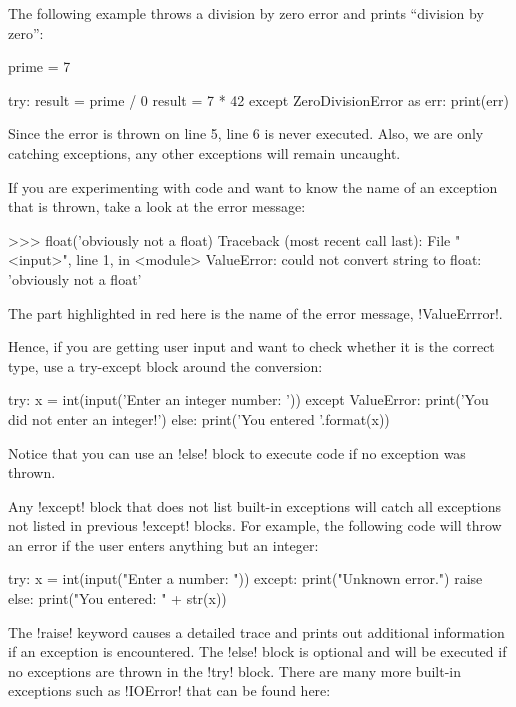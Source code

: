 \documentclass[11pt]{cselabheader}
\begin{document}
The following example throws a division by zero error and prints ``division by
zero'':

\begin{python3code}
prime = 7

try:
    result = prime / 0
    result = 7 * 42
except ZeroDivisionError as err:
    print(err)
\end{python3code}

Since the error is thrown on line 5, line 6 is never executed. Also, we are
only catching  exceptions, any other exceptions
will remain uncaught.

If you are experimenting with code and want to know the name of an exception
that is thrown, take a look at the error message:

\begin{pyconcode}
>>> float('obviously not a float)
Traceback (most recent call last):
  File "<input>", line 1, in <module>
ValueError: could not convert string to float: 'obviously not a float'
\end{pyconcode}

The part highlighted in red here is the name of the error message,
\pythoninline!ValueErrror!.

Hence, if you are getting user input and want to check whether it is the
correct type, use a try-except block around the conversion:

\begin{python3code}
try:
    x = int(input('Enter an integer number: '))
except ValueError:
    print('You did not enter an integer!')
else:
    print('You entered {}'.format(x))
\end{python3code}

Notice that you can use an \pythoninline!else! block to execute code if no
exception was thrown.

Any \pythoninline!except!  block that does not list built-in exceptions will
catch all exceptions not listed in previous \pythoninline!except! blocks.
For example, the following code will throw an error if the user enters
anything but an integer:

\begin{python3code}
try:
    x = int(input("Enter a number: "))
except:
    print("Unknown error.")
    raise
else:
    print("You entered: " + str(x))
\end{python3code}

The \pythoninline!raise! keyword causes a detailed trace and prints out
additional information if an exception is encountered.  The
\pythoninline!else! block is optional and will be executed if no exceptions
are thrown in the \pythoninline!try! block.  There are many more built-in
exceptions such as \pythoninline!IOError! that can be found here:
\end{document}
